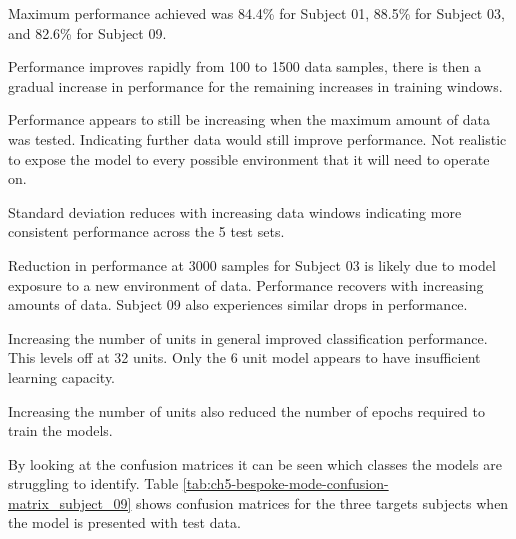 Maximum performance achieved was 84.4\% for Subject 01, 88.5\% for Subject 03, and 82.6\% for Subject 09.

Performance improves rapidly from 100 to 1500 data samples, there is then a gradual increase in performance for the remaining increases in training windows.

Performance appears to still be increasing when the maximum amount of data was tested. Indicating further data would still improve performance. Not realistic to expose the model to every possible environment that it will need to operate on.

Standard deviation reduces with increasing data windows indicating more consistent performance across the 5 test sets.

Reduction in performance at 3000 samples for Subject 03 is likely due to model exposure to a new environment of data. Performance recovers with increasing amounts of data. Subject 09 also experiences similar drops in performance.

Increasing the number of units in general improved classification performance. This levels off at 32 units. Only the 6 unit model appears to have insufficient learning capacity. 

Increasing the number of units also reduced the number of epochs required to train the models. 

By looking at the confusion matrices it can be seen which classes the models are struggling to identify. Table \ref{tab:ch5-bespoke-mode-confusion-matrix_subject_09} shows confusion matrices for the three targets subjects when the model is presented with test data.

